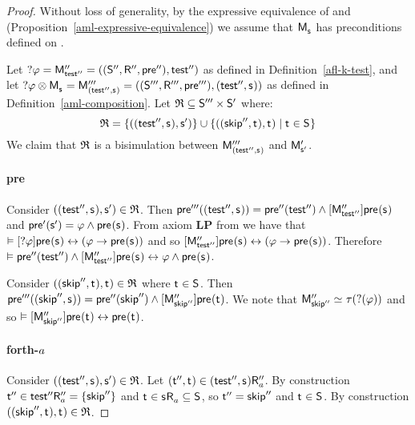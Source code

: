 \begin{proof}
Without loss of generality, by the expressive equivalence of \logicAmlK{} and \logicK{} (Proposition~\ref{aml-expressive-equivalence}) we assume that $\aPModel{\aStateS}$ has preconditions defined on \langMl{}.

Let $\test{\phi} = \aPModelAndTuplePP{\aStateTestPP}$ as defined in Definition~\ref{afl-k-test}, and let $\test{\phi} \exec \aPModel{\aStateS} = \aPModelAndTuplePPP{(\aStateTestPP, \aStateS)}$ as defined in Definition~\ref{aml-composition}.
Let $\mathfrak{R} \subseteq {\mathsf{S}^{\prime\prime\prime}} \times {\mathsf{S}^{\prime}}$ where:
$$
\bisimulation = \{((\aStateTestPP, \aStateS), \aStateSP)\} \cup \{((\aStateSkipPP, \aStateT), \aStateT) \mid \aStateT \in \aStates\}
$$
We claim that $\mathfrak{R}$ is a bisimulation between $\aPModelPPP{(\aStateTestPP, \aStateS)}$ and ${\mathsf{M}^{\prime}_{{\mathsf{{s}}^{\prime}}}}$.

\paragraph{pre}
Consider $((\aStateTestPP, \aStateS), \aStateSP) \in \bisimulation$.
Then $\aPreconditionPPP((\aStateTestPP, \aStateS)) = \aPreconditionPP(\aStateTestPP) \land \actionA{\aPModelPP{\aStateTestPP}} \aPrecondition(\aStateS)$ and $\aPreconditionP(\aStateSP) = \phi \land \aPrecondition(\aStateS)$.
From axiom {\bf LP} from \axiomAflK{} we have that $\entails \actionA{\test{\phi}} \aPrecondition(\aStateS) \iff (\phi \implies \aPrecondition(\aStateS))$ and so $\actionA{\aPModelPP{\aStateTestPP}} \aPrecondition(\aStateS) \iff (\phi \implies \aPrecondition(\aStateS))$.
Therefore $\entails \aPreconditionPP(\aStateTestPP) \land \actionA{\aPModelPP{\aStateTestPP}} \aPrecondition(\aStateS) \iff \phi \land \aPrecondition(\aStateS)$.

Consider $((\aStateSkipPP, \aStateT), \aStateT) \in \bisimulation$ where $\aStateT \in \aStates$.
Then $\aPreconditionPPP((\aStateSkipPP, \aStateS)) = \aPreconditionPP(\aStateSkipPP) \land \actionA{\aPModelPP{\aStateSkipPP}} \aPrecondition(\aStateT)$.
We note that $\aPModelPP{\aStateSkipPP} \bisimilar \tau(\test(\phi))$ and so $\entails \actionA{\aPModelPP{\aStateSkipPP}} \aPrecondition(\aStateT) \iff \aPrecondition(\aStateT)$.

\paragraph{forth-$a$}
Consider $((\aStateTestPP, \aStateS), \aStateSP) \in \bisimulation$.
Let $(\aStateTPP, \aStateT) \in \aSuccessorsPPPA{(\aStateTestPP, \aStateS)}$.
By construction ${\mathsf{{t}}^{\prime\prime}} \in {{\mathsf{{test}}^{\prime\prime}}} {\mathsf{R}^{\prime\prime}_{a}} = \{{\mathsf{{skip}}^{\prime\prime}}\}$ and $\aStateT \in \aSuccessorsA{\aStateS} \subseteq \aStates$, so ${\mathsf{{t}}^{\prime\prime}} = {\mathsf{{skip}}^{\prime\prime}}$ and $\aStateT \in \aStates$.
By construction $((\aStateSkipPP, \aStateT), \aStateT) \in \bisimulation$.


\end{proof}
